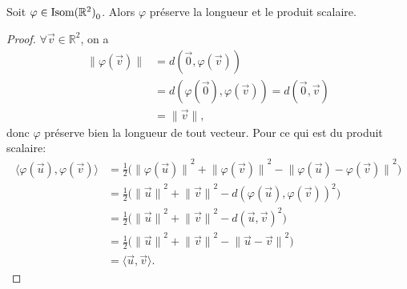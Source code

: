 \documentclass{book}
\numberwithin{equation}{section}
\renewcommand{\phi}{\varphi}
\providecommand{\plan}{{\mathbb R^2}}
\providecommand{\origin}{{\vec 0}}
\providecommand{\isom}{{\textnormal{Isom}(\plan)}}
\providecommand{\isomo}{{\isom_0}}
\providecommand{\longueur}[1]{{\lVert#1\rVert}}
\providecommand{\scalaire}[1]{{\langle#1\rangle}}
\begin{document}
\begin{lemme}
	Soit $\phi \in \isomo$. Alors $\phi$ préserve la longueur et le produit scalaire.
\end{lemme}
\begin{proof}
	$\forall \vec v \in \plan$, on a
	\begin{align*}
		\longueur{\phi(\vec v)} &= d(\origin, \phi(\vec v))\\
		&= d(\phi(\origin), \phi(\vec v)) = d(\origin, \vec v)\\
		&= \longueur{\vec v},
	\end{align*}
	donc $\phi$ préserve bien la longueur de tout vecteur.
	Pour ce qui est du produit scalaire:
	\begin{align*}
		\scalaire{\phi(\vec u), \phi(\vec v)} &= \frac12\bigl( \longueur{\phi(\vec u)}^2 + \longueur{\phi(\vec v)}^2 - \longueur{\phi(\vec u) - \phi(\vec v)}^2 \bigr)\\
		&= \frac12\bigl( \longueur{\vec u}^2 + \longueur{\vec v}^2 - d(\phi(\vec u), \phi(\vec v))^2 \bigr)\\
		&= \frac12\bigl( \longueur{\vec u}^2 + \longueur{\vec v}^2 - d(\vec u, \vec v)^2 \bigr)\\
		&= \frac12\bigl( \longueur{\vec u}^2 + \longueur{\vec v}^2 - \longueur{\vec u - \vec v}^2 \bigr)\\
		&= \scalaire{\vec u, \vec v}.
	\end{align*}
\end{proof}
\end{document}
